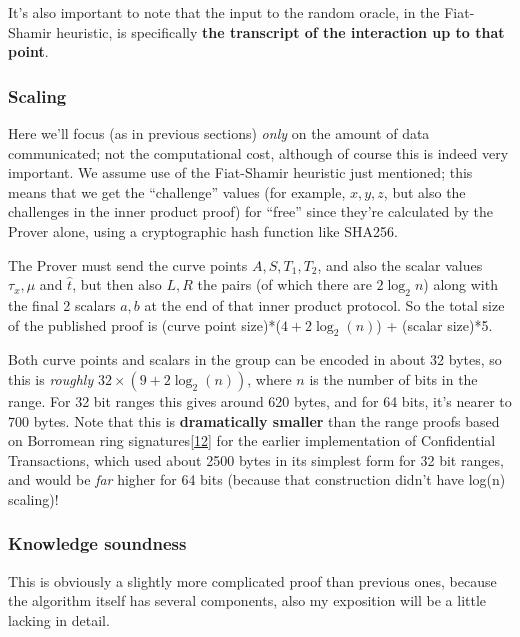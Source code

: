 \documentclass[10pt,a4paper]{article}
\begin{document}
It's also important to note that the input to the random oracle, in the
Fiat-Shamir heuristic, is specifically \textbf{the transcript of the
interaction up to that point}.

\hypertarget{scaling-1}{%
\subsubsection[Scaling]{\texorpdfstring{\protect\hypertarget{anchor-61}{}{}Scaling}{Scaling}}\label{scaling-1}}

Here we'll focus (as in previous sections) \emph{only} on the amount of
data communicated; not the computational cost, although of course this
is indeed very important. We assume use of the Fiat-Shamir heuristic
just mentioned; this means that we get the ``challenge'' values (for
example, $x, y, z$, but also the challenges in the inner product proof) for
``free'' since they're calculated by the Prover alone, using a
cryptographic hash function like SHA256.

The Prover must send the curve points $A, S, T_1, T_2$, and also the scalar values $\tau_x, \mu$ and $\hat{t}$,
but then also $L,R$ the pairs (of which there are $2\log_2n$) along with the final 2
scalars $a, b$ at the end of that inner product protocol. So the total size of
the published proof is (curve point size)*($4+2\log_2(n)$) + (scalar size)*5.

Both curve points and scalars in the group can be encoded in about 32
bytes, so this is \emph{roughly} $32 \times (9 + 2\log_2(n))$, where $n$ is the number of bits in the
range. For 32 bit ranges this gives around 620 bytes, and for 64 bits,
it's nearer to 700 bytes. Note that this is \textbf{dramatically
smaller} than the range proofs based on Borromean ring
signatures{[}\protect\hyperlink{anchor-62}{12}{]} for the earlier
implementation of Confidential Transactions, which used about 2500 bytes
in its simplest form for 32 bit ranges, and would be \emph{far} higher
for 64 bits (because that construction didn't have log(n) scaling)!

\hypertarget{knowledge-soundness-2}{%
\subsubsection[Knowledge
soundness]{\texorpdfstring{\protect\hypertarget{anchor-63}{}{}Knowledge
soundness}{Knowledge soundness}}\label{knowledge-soundness-2}}

This is obviously a slightly more complicated proof than previous ones,
because the algorithm itself has several components, also my exposition
will be a little lacking in detail.
\end{document}
